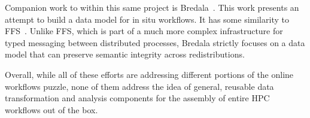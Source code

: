 Companion work to \sys within this same project is
Bredala~\cite{dreher:2016:bredala}. This work presents an attempt to build a
data model for in situ workflows. It has some similarity to
FFS~\cite{eisenhauer:2011:ffs}. Unlike FFS, which is part of a much more
complex infrastructure for typed messaging between distributed processes,
Bredala strictly focuses on a data model that can preserve
semantic integrity across redistributions.

Overall, while all of these efforts are addressing different portions of the
online workflows puzzle, none of them address the idea of general,
reusable data transformation and analysis components for the assembly
of entire HPC workflows out of the box.

